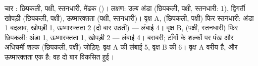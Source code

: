 \begin{example}[दो वृक्ष, गिने हुए]\label{ex:b1:classifying-biodiversity:count}
चार : छिपकली, पक्षी, स्तनधारी, मेंढक ()। लक्षण: उल्ब अंडा
(छिपकली, पक्षी, स्तनधारी: 1), द्विगर्ती खोपड़ी (छिपकली,
पक्षी), ऊष्मारक्तता (पक्षी, स्तनधारी)। वृक्ष A, (छिपकली, पक्षी) फिर स्तनधारी:
अंडा 1 बदलाव, खोपड़ी 1, ऊष्मारक्तता 2 (दो बार उठती) --- लंबाई 4।
वृक्ष B, (पक्षी, स्तनधारी) फिर छिपकली: अंडा 1, ऊष्मारक्तता 1, खोपड़ी 2 ---
लंबाई 4। बराबरी; टाँगों के शल्कों पर पंख और अधिचर्मी
शल्क (छिपकली, पक्षी) जोड़िए: वृक्ष A की लंबाई 5, वृक्ष B की 6। वृक्ष A
वरीय है, और ऊष्मारक्तता एक  है: वह दो बार विकसित हुई।
\end{example}

